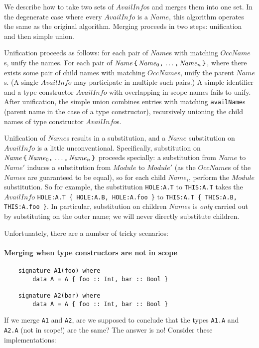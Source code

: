 \documentclass{article}
\newcommand{\I}[1]{\ensuremath{\mathit{#1}}}
\begin{document}
We describe how to take two sets of \I{AvailInfo}s and merges them
into one set.  In the degenerate case where every \I{AvailInfo} is a
$Name$, this algorithm operates the same as the original algorithm.
Merging proceeds in two steps: unification and then simple union.

Unification proceeds as follows: for each pair of \I{Name}s with
matching \I{OccName}s, unify the names.  For each pair of $\I{Name}\, \verb|{|\,
\I{Name}_0\verb|,|\, \ldots\verb|,|\, \I{Name}_n\, \verb|}|$, where there
exists some pair of child names with matching \I{OccName}s, unify the
parent \I{Name}s.  (A single \I{AvailInfo} may participate in multiple such
pairs.)  A simple identifier and a type constructor \I{AvailInfo} with
overlapping in-scope names fails to unify.  After unification,
the simple union combines entries with matching \verb|availName|s (parent
name in the case of a type constructor), recursively unioning the child
names of type constructor \I{AvailInfo}s.

Unification of \I{Name}s results in a substitution, and a \I{Name} substitution
on \I{AvailInfo} is a little unconventional.  Specifically, substitution on $\I{Name}\, \verb|{|\,
\I{Name}_0\verb|,|\, \ldots\verb|,|\, \I{Name}_n\, \verb|}|$ proceeds specially:
a substitution from \I{Name} to $\I{Name}'$ induces a substitution from
\I{Module} to $Module'$ (as the \I{OccName}s of the \I{Name}s are guaranteed
to be equal), so for each child $\I{Name}_i$, perform the \I{Module}
substitution.  So for example, the substitution \verb|HOLE:A.T| to \verb|THIS:A.T|
takes the \I{AvailInfo} \verb|HOLE:A.T { HOLE:A.B, HOLE:A.foo }| to
\verb|THIS:A.T { THIS:A.B, THIS:A.foo }|.  In particular, substitution
on children \I{Name}s is \emph{only} carried out by substituting on the outer name;
we will never directly substitute children.

Unfortunately, there are a number of tricky scenarios:

\paragraph{Merging when type constructors are not in scope}

\begin{verbatim}
    signature A1(foo) where
        data A = A { foo :: Int, bar :: Bool }

    signature A2(bar) where
        data A = A { foo :: Int, bar :: Bool }
\end{verbatim}
%
If we merge \verb|A1| and \verb|A2|, are we supposed to conclude that
the types \verb|A1.A| and \verb|A2.A| (not in scope!) are the same?
The answer is no!  Consider these implementations:
\end{document}
